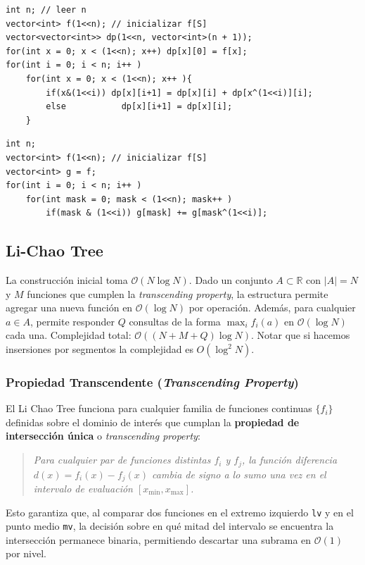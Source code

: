 \begin{verbatim}
int n; // leer n
vector<int> f(1<<n); // inicializar f[S]
vector<vector<int>> dp(1<<n, vector<int>(n + 1));
for(int x = 0; x < (1<<n); x++) dp[x][0] = f[x];
for(int i = 0; i < n; i++ )
    for(int x = 0; x < (1<<n); x++ ){
        if(x&(1<<i)) dp[x][i+1] = dp[x][i] + dp[x^(1<<i)][i];
        else           dp[x][i+1] = dp[x][i];
    }
\end{verbatim}

\begin{verbatim}
int n;
vector<int> f(1<<n); // inicializar f[S]
vector<int> g = f;
for(int i = 0; i < n; i++ )
    for(int mask = 0; mask < (1<<n); mask++ )
        if(mask & (1<<i)) g[mask] += g[mask^(1<<i)];
\end{verbatim}


\subsection{Li-Chao Tree}
La construcción inicial toma $\mathcal{O}(N \log N)$. Dado un conjunto $A \subset \mathbb{R}$ con $|A|=N$ y $M$ funciones que cumplen la \textit{transcending property}, la estructura permite agregar una nueva función en $\mathcal{O}(\log N)$ por operación. Además, para cualquier $a \in A$, permite responder $Q$ consultas de la forma $\max_i f_i(a)$ en $\mathcal{O}(\log N)$ cada una. Complejidad total: $\mathcal{O}((N + M + Q) \log N)$. Notar que si hacemos insersiones por segmentos la complejidad es $O(\log^2 N)$.


\begin{extended}
    \subsubsection*{Propiedad Transcendente (\textit{Transcending Property})}
    El Li Chao Tree funciona para cualquier familia de funciones continuas $\{f_i\}$ definidas sobre el dominio de interés que cumplan la \textbf{propiedad de intersección única} o \textit{transcending property}:
    \begin{quote}
    \textit{Para cualquier par de funciones distintas $f_i$ y $f_j$, la función diferencia $d(x) = f_i(x) - f_j(x)$ cambia de signo a lo sumo una vez en el intervalo de evaluación $[x_{\min}, x_{\max}]$.}
    \end{quote}
    Esto garantiza que, al comparar dos funciones en el extremo izquierdo \texttt{lv} y en el punto medio \texttt{mv}, la decisión sobre en qué mitad del intervalo se encuentra la intersección permanece binaria, permitiendo descartar una subrama en $\mathcal{O}(1)$ por nivel.
\end{extended}



